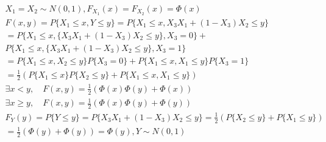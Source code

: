\documentclass{article}
\begin{document}
\begin{align*}
    X_{1} = X_{2} \sim N(0,1) ,F_{X_{1}}(x) = F_{X_{2}}(x) = \Phi(x) \\
    F(x,y) = P\{X_{1} \le x,Y \le y\} = P\{X_{1} \le x,X_{3}X_{1}+(1-X_{3})X_{2} \le y\} \\
    = P\{X_{1} \le x,\{X_{3}X_{1}+(1-X_{3})X_{2} \le y \},X_{3}=0\} + \\ 
    P\{X_{1} \le x,\{X_{3}X_{1}+(1-X_{3})X_{2} \le y \},X_{3}=1 \} \\
    = P\{X_{1} \le x,X_{2} \le y \}P\{X_{3}=0\} +P\{X_{1} \le x,X_{1}\le y \} P\{X_{3}=1\} \\
    = \frac{1}{2} \left(P\{X_{1} \le x\}P\{X_{2} \le y \} +P\{X_{1} \le x,X_{1}\le y \} \right) \\
    \exists x < y ,\quad F(x,y) = \frac{1}{2}\left(\Phi(x)\Phi(y)+\Phi(x)\right) \\
    \exists x \ge y ,\quad F(x,y) = \frac{1}{2}\left(\Phi(x)\Phi(y)+\Phi(y)\right) \\
    F_{Y}(y) = P\{Y \le y\} = P\{X_{3}X_{1}+(1-X_{3})X_{2} \le y\} = \frac{1}{2}\left(P\{X_{2} \le y\} + P\{X_{1} \le y\}\right) \\
    = \frac{1}{2} \left(\Phi(y)+\Phi(y)\right) = \Phi(y) ,Y \sim N(0,1) \\
\end{align*}
\end{document}
